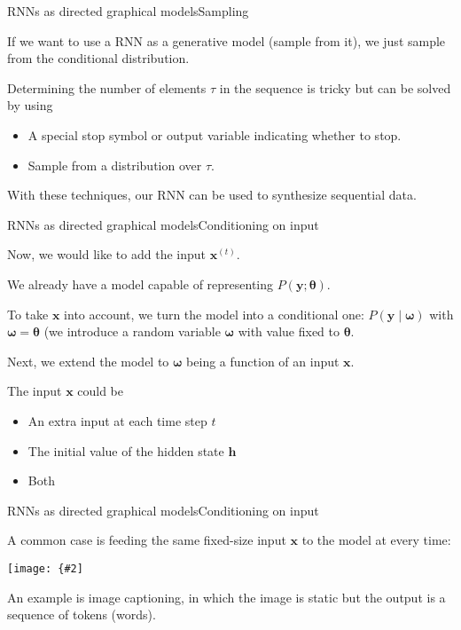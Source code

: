 \documentclass{beamer}
\renewcommand{\vec}[1]{\boldsymbol{#1}}
\newcommand{\myfig}[3]{\centerline{\texttt{[image: \{\#2]}}}
    \centerline{\scriptsize #3}}
\begin{document}
\begin{frame}{RNNs as directed graphical models}{Sampling}

  If we want to use a RNN as a generative model (sample from it),
  we just sample from the conditional distribution.

  \medskip

  Determining the number of elements $\tau$ in the sequence is tricky
  but can be solved by using
  \begin{itemize}
  \item A special \alert{stop symbol} or output variable indicating
    whether to stop.
  \item Sample from a distribution over $\tau$.
  \end{itemize}

  \medskip

  With these techniques, our RNN can be used to synthesize sequential
  data.
    
\end{frame}


\begin{frame}{RNNs as directed graphical models}{Conditioning on input}

  Now, we would like to add the \alert{input} $\vec{x}^{(t)}$.

  \medskip

  We already have a model capable of representing $P(\vec{y} ;
  \vec{\theta})$.

  \medskip

  To take $\vec{x}$ into account, we turn the model into a conditional
  one: $P(\vec{y} \mid \vec{\omega})$ with $\vec{\omega}=\vec{\theta}$
  (we introduce a random variable $\vec{\omega}$ with value fixed to
  $\vec{\theta}$.

  \medskip

  Next, we extend the model to $\vec{\omega}$ being a function of an
  input $\vec{x}$.

  \medskip

  The input $\vec{x}$ could be
  \begin{itemize}
  \item An extra input at each time step $t$
  \item The initial value of the hidden state $\vec{h}$
  \item Both
  \end{itemize}
  
\end{frame}


\begin{frame}{RNNs as directed graphical models}{Conditioning on input}

  A common case is feeding the same fixed-size input $\vec{x}$ to the model
  at every time:

  \myfig{1.8in}{goodfellow-fig10-09}{Goodfellow, Bengio, and Courville (2016), Fig.\ 10.9}

  \medskip

  An example is \alert{image captioning}, in which the image is static
  but the output is a sequence of tokens (words).
  
\end{frame}
\end{document}
